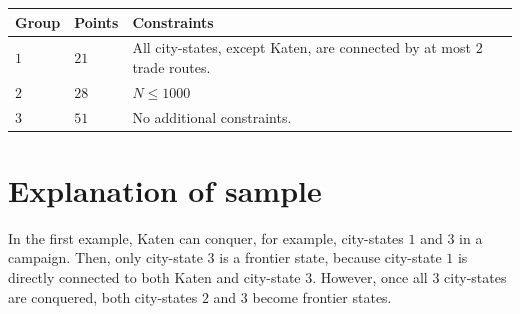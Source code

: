 \noindent
\begin{tabular}{| l | l | p{12cm} |}
  \hline
  \textbf{Group} & \textbf{Points} & \textbf{Constraints} \\ \hline
  $1$    & $21$      & All city-states, except Katen, are connected by at most $2$ trade routes. \\ \hline
  $2$    & $28$      & $N \le 1000$ \\ \hline
  $3$    & $51$      & No additional constraints. \\ \hline
\end{tabular}


\section*{Explanation of sample}
In the first example, Katen can conquer, for example, city-states $1$ and $3$ in a campaign.
Then, only city-state $3$ is a frontier state, because city-state $1$ is directly connected to both Katen and city-state $3$.
However, once all $3$ city-states are conquered, both city-states $2$ and $3$ become frontier states.
